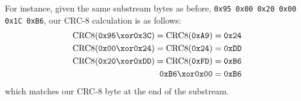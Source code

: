 \clearpage
For instance, given the same substream bytes as before,
\texttt{0x95 0x00 0x20 0x00 0x1C 0xB6},
our CRC-8 calculation is as follows:
\begin{align*}
\text{CRC8}(\texttt{0x95} \xor \texttt{0x3C}) = \text{CRC8}(\texttt{0xA9}) &= \texttt{0x24} \\
\text{CRC8}(\texttt{0x00} \xor \texttt{0x24}) = \text{CRC8}(\texttt{0x24}) &= \texttt{0xDD} \\
\text{CRC8}(\texttt{0x20} \xor \texttt{0xDD}) = \text{CRC8}(\texttt{0xFD}) &= \texttt{0xB6} \\
\texttt{0xB6} \xor \texttt{0x00} &= \texttt{0xB6}
\end{align*}
which matches our CRC-8 byte at the end of the substream.
